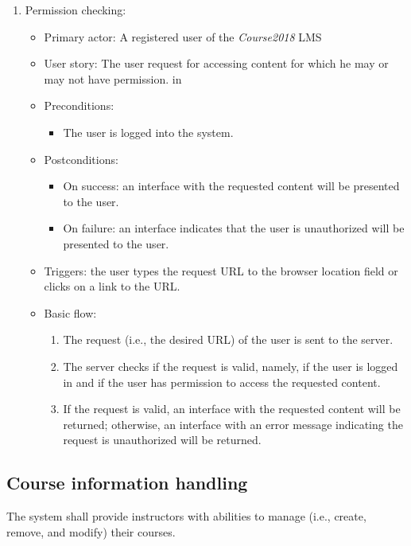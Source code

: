 \begin{enumerate}
\item Permission checking:
\begin{itemize}
\item Primary actor: 
    A registered user of the \emph{Course2018} LMS
\item User story:
    The user request for accessing content for which he may or may not have
    permission.
 in
\item Preconditions:
    \begin{itemize}
        \item The user is logged into the system.
    \end{itemize}
\item Postconditions:
    \begin{itemize}
        \item On success: an interface with the requested content will be presented
            to the user.
        \item On failure: an interface indicates that the user is unauthorized will
            be presented to the user.
    \end{itemize}
\item Triggers: the user types the request URL to the browser location field
    or clicks on a link to the URL.
\item Basic flow:
    \begin{enumerate}
        \item The request (i.e., the desired URL) of the user is sent to the server.
        \item The server checks if the request is valid, namely, if the user
            is logged in and if the user has permission to access the requested
            content.
        \item If the request is valid, an interface with the requested content will
            be returned; otherwise, an interface with an error message 
            indicating the request is unauthorized will be returned.
    \end{enumerate}
\end{itemize}

\end{enumerate}


\subsection{Course information handling}
The system shall provide instructors with abilities to manage (i.e., create, remove,
and modify) their courses.

